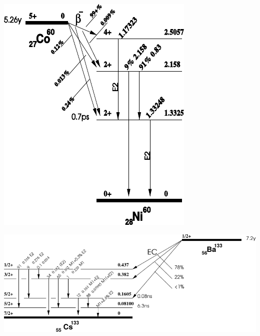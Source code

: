 %
\begin{center}
    \begin{adjustbox}{max width=\linewidth, keepaspectratio}
        \includegraphics[]{pdf/60Co}
    \end{adjustbox}
    \label{fig:60CoDecayScheme}
\end{center}
%
\begin{center}
    \begin{adjustbox}{max width=\linewidth, keepaspectratio}
        \includegraphics[]{pdf/133Ba}
    \end{adjustbox}
    \label{fig:133BaDecayScheme}
\end{center}
%
